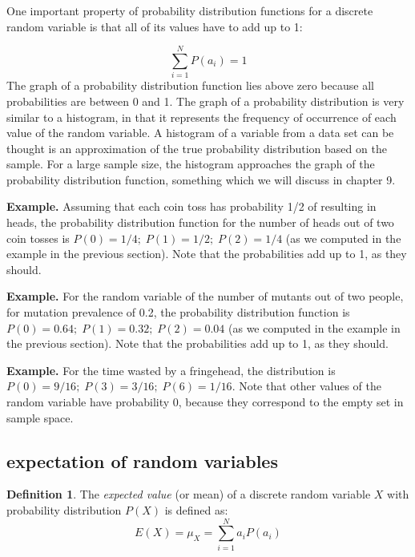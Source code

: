 \documentclass[
]{book}
\theoremstyle{definition}
\newtheorem{definition}{Definition}[chapter]
\theoremstyle{definition}
\theoremstyle{definition}
\theoremstyle{remark}
\begin{document}
One important property of probability distribution functions for a discrete random variable is that all of its values have to add up to 1:

\[\sum_{i=1}^N P(a_i) =1\]
The graph of a probability distribution function lies above zero because all probabilities are between 0 and 1. The graph of a probability distribution is very similar to a histogram, in that it represents the frequency of occurrence of each value of the random variable. A histogram of a variable from a data set can be thought is an approximation of the true probability distribution based on the sample. For a large sample size, the histogram approaches the graph of the probability distribution function, something which we will discuss in chapter 9.

\textbf{Example.} Assuming that each coin toss has probability 1/2 of resulting in heads, the probability distribution function for the number of heads out of two coin tosses is \(P(0) = 1/4; \; P(1) = 1/2; \; P(2) = 1/4\) (as we computed in the example in the previous section). Note that the probabilities add up to 1, as they should.

\textbf{Example.} For the random variable of the number of mutants out of two people, for mutation prevalence of 0.2, the probability distribution function is \(P(0) = 0.64; \; P(1) = 0.32; \; P(2) = 0.04\) (as we computed in the example in the previous section). Note that the probabilities add up to 1, as they should.

\textbf{Example.} For the time wasted by a fringehead, the distribution is \(P(0)= 9/16; \; P(3) = 3/16; \; P(6) = 1/16\). Note that other values of the random variable have probability 0, because they correspond to the empty set in sample space.

\hypertarget{expectation-of-random-variables}{%
\subsection{expectation of random variables}\label{expectation-of-random-variables}}

\begin{definition}
\protect\hypertarget{def:def-exp-val}{}{\label{def:def-exp-val} }The \emph{expected value} (or mean) of a discrete random variable \(X\) with probability distribution \(P(X)\) is defined as:
\[ E(X) = \mu_X = \sum_{i=1}^N  a_i P(a_i)\]
\end{definition}
\end{document}
